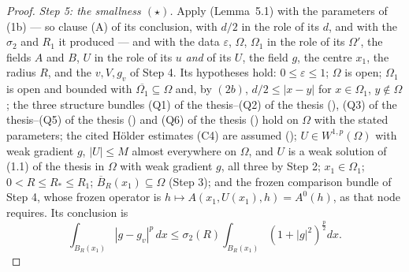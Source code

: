 \begin{proof}
\emph{Step 5: the smallness $(\star)$.}  Apply
 (Lemma~5.1) with the parameters of
(1b) --- so clause (A) of its conclusion, with $d/2$ in the role of its
$d$, and with the $\sigma_2$ and $R_1$ it produced --- and with the data $\varepsilon$, $\Omega$,
$\Omega_1$ in the role of its $\Omega'$, the fields $A$ and $B$,
$U$ in the role of its $u$ \emph{and} of its $U$, the field $g$, the centre
$x_1$, the radius $R$, and the $v,V,g_v$ of Step 4.  Its hypotheses hold:
$0\le\varepsilon\le1$; $\Omega$ is open; $\Omega_1$ is open and
bounded with $\overline{\Omega_1}\subseteq\Omega$ and, by $(2b)$,
$d/2\le|x-y|$ for $x\in\Omega_1$, $y\notin\Omega$; the three
structure bundles (Q1) of the thesis--(Q2) of the thesis
(), (Q3) of the thesis--(Q5) of the thesis
() and (Q6) of the thesis
() hold on $\Omega$ with the stated parameters;
the cited H\"older estimates (C4) are assumed
(); $U\in W^{1,p}(\Omega)$ with weak
gradient $g$, $|U|\le M$ almost everywhere on $\Omega$, and $U$ is a
weak solution of (1.1) of the thesis in $\Omega$ with weak gradient $g$, all three by
Step 2; $x_1\in\Omega_1$; $0<R\le R_\ast\le R_1$;
$\overline B_R(x_1)\subseteq\Omega$ (Step 3); and the frozen comparison bundle
of Step 4, whose frozen operator is $h\mapsto A(x_1,U(x_1),h)=A^0(h)$, as that
node requires.  Its conclusion is
\[
\int_{B_R(x_1)}|g-g_v|^p\,dx
\le\sigma_2(R)\int_{B_R(x_1)}(1+|g|^2)^{\frac p2}dx .
\tag{$\star$}
\]


\end{proof}
